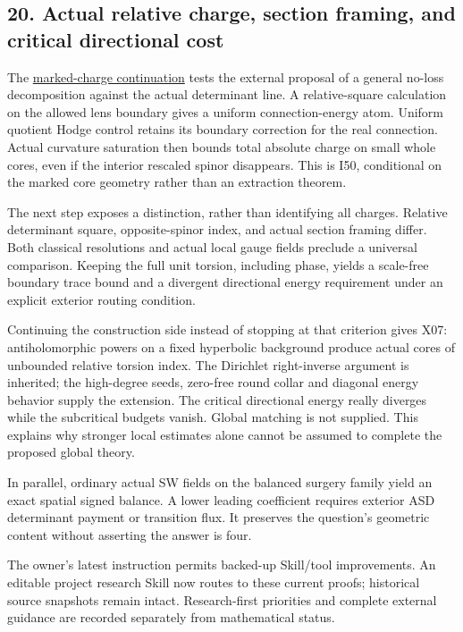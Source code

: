 \documentclass[
  10pt,
]{article}
\begin{document}
\hypertarget{actual-relative-charge-section-framing-and-critical-directional-cost}{%
\subsection{20. Actual relative charge, section framing, and critical
directional
cost}\label{actual-relative-charge-section-framing-and-critical-directional-cost}}

The
\href{../continuation/20260927_marked_charge_and_first_order_flux.md}{marked-charge
continuation} tests the external proposal of a general no-loss
decomposition against the actual determinant line. A relative-square
calculation on the allowed lens boundary gives a uniform
connection-energy atom. Uniform quotient Hodge control retains its
boundary correction for the real connection. Actual curvature saturation
then bounds total absolute charge on small whole cores, even if the
interior rescaled spinor disappears. This is I50, conditional on the
marked core geometry rather than an extraction theorem.

The next step exposes a distinction, rather than identifying all
charges. Relative determinant square, opposite-spinor index, and actual
section framing differ. Both classical resolutions and actual local
gauge fields preclude a universal comparison. Keeping the full unit
torsion, including phase, yields a scale-free boundary trace bound and a
divergent directional energy requirement under an explicit exterior
routing condition.

Continuing the construction side instead of stopping at that criterion
gives X07: antiholomorphic powers on a fixed hyperbolic background
produce actual cores of unbounded relative torsion index. The Dirichlet
right-inverse argument is inherited; the high-degree seeds, zero-free
round collar and diagonal energy behavior supply the extension. The
critical directional energy really diverges while the subcritical
budgets vanish. Global matching is not supplied. This explains why
stronger local estimates alone cannot be assumed to complete the
proposed global theory.

In parallel, ordinary actual SW fields on the balanced surgery family
yield an exact spatial signed balance. A lower leading coefficient
requires exterior ASD determinant payment or transition flux. It
preserves the question's geometric content without asserting the answer
is four.

The owner's latest instruction permits backed-up Skill/tool
improvements. An editable project research Skill now routes to these
current proofs; historical source snapshots remain intact.
Research-first priorities and complete external guidance are recorded
separately from mathematical status.
\end{document}
